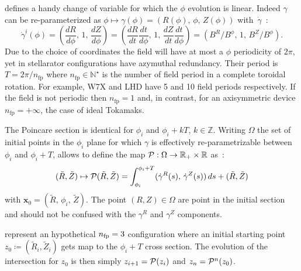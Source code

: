 defines a handy change of variable for which the $\phi$ evolution is linear. Indeed $\gamma$ can be re-parameterized as $\phi \mapsto \gamma(\phi) = (R(\phi),\,\phi,\,Z(\phi))$ with~$\dot{\gamma}$~:
\begin{equation*}
    \dot{\gamma}^i(\phi) = (\frac{dR}{d\phi},\,1,\,\frac{dZ}{d\phi}) = (\frac{dR}{dt}\frac{dt}{d\phi},\,1,\,\frac{dZ}{dt}\frac{dt}{d\phi}) = (B^R/B^\phi,\, 1,\,B^Z/B^\phi).
\end{equation*}
Due to the choice of coordinates the field will have at most a $\phi$ periodicity of $2\pi$, yet in stellarator configurations have azymuthal redundancy. Their period is $T = 2\pi/n_\text{fp}$ where $n_\text{fp}\in\mathbb{N}^\star$ is the number of field period in a complete toroidal rotation. For example, W7X and LHD have 5 and 10 field periods respectively. If the field is not periodic then $n_\text{fp} = 1$ and, in contrast, for an axisymmetric device $n_\text{fp} = +\infty$, the case of ideal Tokamaks.

The Poincare section is identical for $\phi_i$ and $\phi_i+kT$, $k\in\mathbb{Z}$. Writing $\Omega$ the set of initial points in the $\phi_i$ plane for which $\gamma$ is effectively re-parametrizable between $\phi_i$ and $\phi_i + T$, allows to define the map $\mathcal{P} : \Omega \rightarrow \mathbb{R}_+\times\mathbb{R}$ as~:
\begin{equation}\label{eq:pmap}
    (\tilde{R},\tilde{Z}) \mapsto \mathcal{P}(\tilde{R},\tilde{Z}) = \int_{\phi_i}^{\phi_i+T}(
        \dot{\gamma}^R(s),\,
        \dot{\gamma}^Z(s)
    )\,ds + (\tilde{R},\tilde{Z})
\end{equation}
with $\textbf{x}_0 = (\tilde{R},\,\phi_i,\,\tilde{Z})$. 
The point $(R,Z) \in \Omega$ are point in the initial section and should not be confused with the $\gamma^R$ and $\gamma^Z$ components.


 represent an hypothetical $n_\text{fp} = 3$ configuration where an initial starting point $z_0\coloneqq (\tilde{R}_i,\tilde{Z}_i)$ gets map to the $\phi_i + T$ cross section. The evolution of the intersection for $z_0$ is then simply $z_{i+1} = \mathcal{P}(z_i)$ and $z_n = \mathcal{P}^n(z_0)$. 

